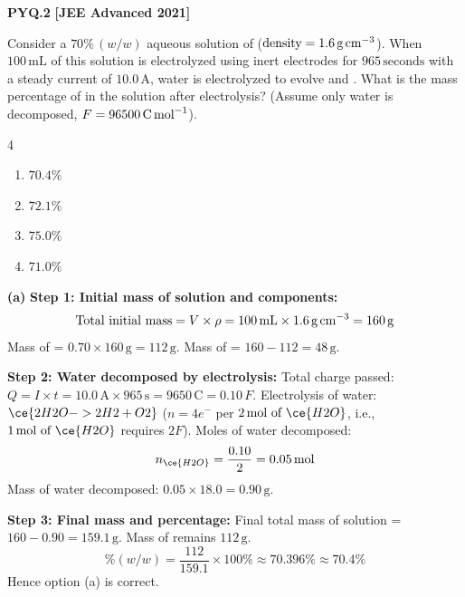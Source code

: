 \begin{problembox}
\textbf{PYQ.2} \hfill \textbf{[JEE Advanced 2021]}

Consider a $70\%\,(w/w)$ aqueous solution of  ($\text{density} = 1.6\,\text{g\,cm}^{-3}$). When $100\,\text{mL}$ of this solution is electrolyzed using inert electrodes for $965\,\text{seconds}$ with a steady current of $10.0\,\text{A}$, water is electrolyzed to evolve  and . What is the mass percentage of  in the solution after electrolysis? (Assume only water is decomposed, $F = 96500\,\text{C\,mol}^{-1}$).
\begin{multicols}{4}
\begin{enumerate}[label=(\alph*)]
    \item $70.4\%$
    \item $72.1\%$
    \item $75.0\%$
    \item $71.0\%$
\end{enumerate}
\end{multicols}
\end{problembox}
\begin{solution}
\textbf{(a)}
\textbf{Step 1: Initial mass of solution and components:}
\begin{equation*}
    \text{Total initial mass} = V \times \rho = 100\,\text{mL} \times 1.6\,\text{g\,cm}^{-3} = 160\,\text{g}
\end{equation*}
Mass of  = $0.70 \times 160\,\text{g} = 112\,\text{g}$.
Mass of  = $160 - 112 = 48\,\text{g}$.

\textbf{Step 2: Water decomposed by electrolysis:}
Total charge passed: $Q = I \times t = 10.0\,\text{A} \times 965\,\text{s} = 9650\,\text{C} = 0.10\,F$.
Electrolysis of water: $\ce{2H2O -> 2H2 + O2}$ ($n = 4e^-$ per $2\,\text{mol of } \ce{H2O}$, i.e., $1\,\text{mol of } \ce{H2O}$ requires $2F$).
Moles of water decomposed:
\begin{equation*}
    n_{\ce{H2O}} = \frac{0.10}{2} = 0.05\,\text{mol}
\end{equation*}
Mass of water decomposed: $0.05 \times 18.0 = 0.90\,\text{g}$.

\textbf{Step 3: Final mass and percentage:}
Final total mass of solution = $160 - 0.90 = 159.1\,\text{g}$.
Mass of  remains $112\,\text{g}$.
\begin{equation*}
    \%(w/w) = \frac{112}{159.1} \times 100\% \approx 70.396\% \approx 70.4\%
\end{equation*}
Hence option (a) is correct.
\end{solution}

